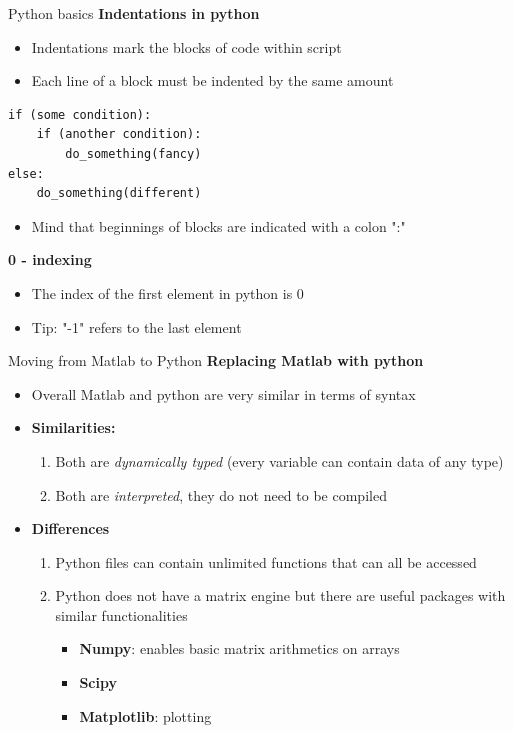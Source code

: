 \documentclass[xcolor=x11names, compress]{beamer}
\renewcommand{\(}{\begin{columns}}
\renewcommand{\)}{\end{columns}}
\newcommand{\<}[1]{\begin{column}{#1}}
\renewcommand{\>}{\end{column}}
\begin{document}

\begin{frame}[fragile]{Python basics}
\textbf{Indentations in python}
\begin{itemize}
\item Indentations mark the blocks of code within script 
\item Each line of a block must be indented by the same amount
\end{itemize}

\begin{lstlisting}[xleftmargin=.2\textwidth]
if (some condition):
    if (another condition):
        do_something(fancy)
else:
    do_something(different)
\end{lstlisting}

\begin{itemize}
\item Mind that beginnings of blocks are indicated with a colon ":"
\end{itemize}

\textbf{0 - indexing}
\begin{itemize}
\item The index of the first element in python is 0
\item Tip: "-1" refers to the last element 
\end{itemize}
\end{frame}


\begin{frame}[fragile]{Moving from Matlab to Python}
\textbf{Replacing Matlab with python}
\begin{itemize}
\item Overall Matlab and python are very similar in terms of syntax
\item \textbf{Similarities:} 
	\begin{enumerate}
	\item Both are \textit{dynamically typed} (every variable can contain data of any type)
	\item Both are \textit{interpreted}, they do not need to be compiled
	\end{enumerate}
\item \textbf{Differences}
	\begin{enumerate}
	\item Python files can contain unlimited functions that can all be accessed 
	\item Python does not have a matrix engine but there are useful packages with similar functionalities
		\begin{itemize}
		\item \textbf{Numpy}: enables basic matrix arithmetics on arrays
		\item \textbf{Scipy}
		\item \textbf{Matplotlib}: plotting
		\end{itemize}
	\end{enumerate}
\end{itemize}
\end{frame}
\end{document}
